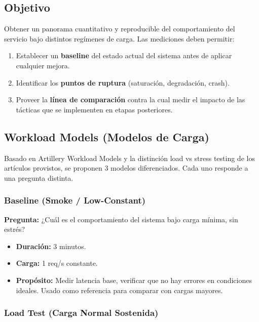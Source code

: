 \subsection{Objetivo}

Obtener un panorama cuantitativo y reproducible del comportamiento del servicio bajo distintos regímenes de carga. Las mediciones deben permitir:

\begin{enumerate}[leftmargin=*]
    \item Establecer un \textbf{baseline} del estado actual del sistema antes de aplicar cualquier mejora.
    \item Identificar los \textbf{puntos de ruptura} (saturación, degradación, crash).
    \item Proveer la \textbf{línea de comparación} contra la cual medir el impacto de las tácticas que se implementen en etapas posteriores.
\end{enumerate}

\subsection{Workload Models (Modelos de Carga)}

Basado en Artillery Workload Models y la distinción load vs stress testing de los artículos provistos, se proponen 3 modelos diferenciados. Cada uno responde a una pregunta distinta.

\subsubsection{Baseline (Smoke / Low-Constant)}

\textbf{Pregunta:} ¿Cuál es el comportamiento del sistema bajo carga mínima, sin estrés?

\begin{itemize}[leftmargin=*]
    \item \textbf{Duración:} 3 minutos.
    \item \textbf{Carga:} 1 req/s constante.
    \item \textbf{Propósito:} Medir latencia base, verificar que no hay errores en condiciones ideales. Usado como referencia para comparar con cargas mayores.
\end{itemize}

\subsubsection{Load Test (Carga Normal Sostenida)}

